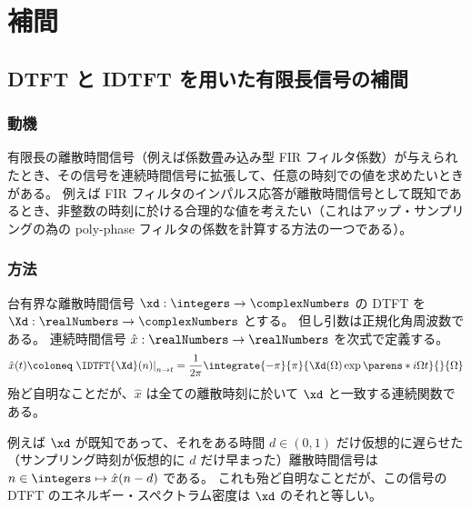 \chapter{補間}
    \section{DTFT と IDTFT を用いた有限長信号の補間}
        \subsection{動機}
            有限長の離散時間信号（例えば係数畳み込み型 FIR フィルタ係数）が与えられたとき、その信号を連続時間信号に拡張して、任意の時刻での値を求めたいときがある。
            例えば FIR フィルタのインパルス応答が離散時間信号として既知であるとき、非整数の時刻に於ける合理的な値を考えたい（これはアップ・サンプリングの為の poly-phase フィルタの係数を計算する方法の一つである）。
        \subsection{方法}
            \label{DTFT と IDTFT を用いた有限長信号の補間の方法}
            台有界な離散時間信号 $\xd:\integers\to\complexNumbers$ の DTFT を $\Xd:\realNumbers\to\complexNumbers$ とする。
            但し引数は正規化角周波数である。
            連続時間信号 $\hat{x}:\realNumbers\to\realNumbers$ を次式で定義する。
            \[ \hat{x}(t)\coloneq\left.\IDTFT{\Xd}(n)\right|_{n\to t} = \frac{1}{2\pi}\integrate{-\pi}{\pi}{\Xd(\Omega)\exp\parens*{i\Omega t}}{}{\Omega} \]
            殆ど自明なことだが、$\hat{x}$ は全ての離散時刻に於いて $\xd$ と一致する連続関数である。
            \par
            例えば $\xd$ が既知であって、それをある時間 $d\in(0,1)$ だけ仮想的に遅らせた（サンプリング時刻が仮想的に $d$ だけ早まった）離散時間信号は $n\in\integers\mapsto\hat{x}(n-d)$ である。
            これも殆ど自明なことだが、この信号の DTFT のエネルギー・スペクトラム密度は $\xd$ のそれと等しい。
